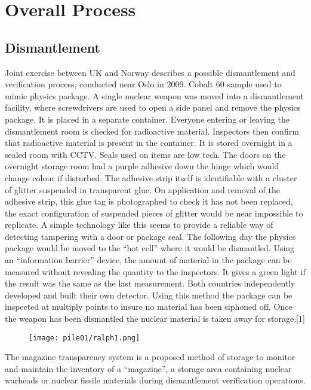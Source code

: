 \documentclass[twoside,titlepage,11pt,twocolumn,a4paper]{article}
\begin{document}
\section{Overall Process}
\subsection{Dismantlement}
Joint exercise between UK and Norway describes a possible
dismantlement and verification process, conducted near Oslo in
2009. Cobalt 60 sample used to mimic physics package. A single nuclear
weapon was moved into a dismantlement facility, where screwdrivers are
used to open a side panel and remove the physics package. It is placed
in a separate container. Everyone entering or leaving the
dismantlement room is checked for radioactive material. Inspectors
then confirm that radioactive material is present in the container. It
is stored overnight in a sealed room with CCTV. Seals used on items
are low tech. The doors on the overnight storage room had a purple
adhesive down the hinge which would change colour if disturbed. The
adhesive strip itself is identifiable with a cluster of glitter
suspended in transparent glue. On application and removal of the
adhesive strip, this glue tag is photographed to check it has not been
replaced, the exact configuration of suspended pieces of glitter would
be near impossible to replicate. A simple technology like this seems
to provide a reliable way of detecting tampering with a door or
package seal. The following day the physics package would be moved to
the ``hot cell'' where it would be dismantled.  Using an ``information
barrier'' device, the amount of material in the package can be
measured without revealing the quantity to the inspectors. It gives a
green light if the result was the same as the last measurement. Both
countries independently developed and built their own detector. Using
this method the package can be inspected at multiply points to insure
no material has been siphoned off. Once the weapon has been dismantled
the nuclear material is taken away for storage.[1]

\begin{figure}
  \texttt{[image: pile01/ralph1.png]}
\end{figure}

The magazine transparency system is a proposed method of storage to
monitor and maintain the inventory of a ``magazine'', a storage area
containing nuclear warheads or nuclear fissile materials during
dismantlement verification operations.
\end{document}
